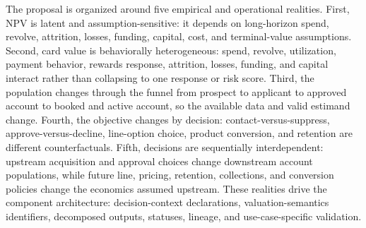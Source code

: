 \documentclass[11pt]{article}
\newcommand{\1}{\mathbf{1}}
\begin{document}
The proposal is organized around five empirical and operational realities.
First, NPV is latent and assumption-sensitive: it depends on long-horizon spend,
revolve, attrition, losses, funding, capital, cost, and terminal-value
assumptions. Second, card value is behaviorally heterogeneous: spend, revolve,
utilization, payment behavior, rewards response, attrition, losses, funding,
and capital interact rather than collapsing to one response or risk score.
Third, the population changes through the funnel from prospect to applicant to
approved account to booked and active account, so the available data and valid
estimand change. Fourth, the objective changes by decision:
contact-versus-suppress, approve-versus-decline, line-option choice, product
conversion, and retention are different counterfactuals. Fifth, decisions are
sequentially interdependent: upstream acquisition and approval choices change
downstream account populations, while future line, pricing, retention,
collections, and conversion policies change the economics assumed upstream.
These realities drive the component architecture: decision-context declarations,
valuation-semantics identifiers, decomposed outputs, statuses, lineage, and
use-case-specific validation.
\end{document}
